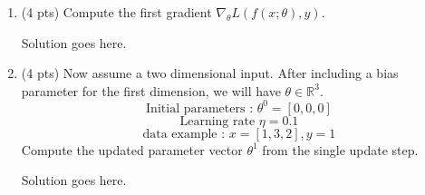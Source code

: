 \documentclass[a4paper]{article}
\theoremstyle{definition}
\newenvironment{soln}{
    \leavevmode\color{blue}\ignorespaces
}{}
\begin{document}
\begin{enumerate}
	      \begin{enumerate}
		      \item (4 pts) Compute the first gradient $\nabla_{\theta} L(f(x;\theta), y)$.

		            \begin{soln}  Solution goes here. \end{soln}

		      \item (4 pts)
		            Now assume a two dimensional input. After including a bias parameter for the first dimension, we will have $\theta\in\mathbb{R}^3$.
		            $$ \text{Initial parameters : }  \theta^{0}=[0, 0, 0]$$
		            $$ \text{Learning rate }\eta=0.1$$
		            $$ \text{data example : } x=[1, 3, 2], y=1$$
		            Compute the updated parameter vector $\theta^{1}$ from the single update step.

		            \begin{soln}  Solution goes here. \end{soln}
	      \end{enumerate}
\end{enumerate}
\end{document}
